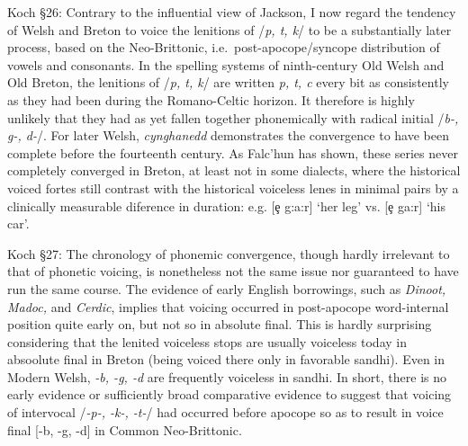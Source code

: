  
 Koch \S26: Contrary to the influential view of Jackson, I now regard the tendency of Welsh and Breton to voice the lenitions of /\textit{p, t, k}/ to be a substantially later process, based on the Neo-Brittonic, i.e.\ post-apocope/syncope distribution of vowels and consonants. In the spelling systems of ninth-century Old Welsh and Old Breton, the lenitions of /\textit{p, t, k}/ are written \textit{p, t, c} every bit as consistently as they had been during the Romano-Celtic horizon. It therefore is highly unlikely that they had as yet fallen together phonemically with radical initial /\textit{b-, g-, d-}/. For later Welsh, \textit{cynghanedd} demonstrates the convergence to have been complete before the fourteenth century. As Falc'hun has shown, these series never completely converged in Breton, at least not in some dialects, where the historical voiced fortes still contrast with the historical voiceless lenes in minimal pairs by a clinically measurable diference in duration: e.g. [\c{e} g:a:r] `her leg' vs. [\c{e} ga:r] `his car'.
 
 Koch \S27: The chronology of phonemic convergence, though hardly irrelevant to that of phonetic voicing, is nonetheless not the same issue nor guaranteed to have run the same course. The evidence of early English borrowings, such as \textit{Dinoot, Madoc,} and \textit{Cerdic}, implies that voicing occurred in post-apocope word-internal position quite early on, but not so in absolute final. This is hardly surprising considering that the lenited voiceless stops are usually voiceless today in absoolute final in Breton (being voiced there only in favorable sandhi). Even in Modern Welsh, \textit{-b, -g, -d} are frequently voiceless in sandhi. In short, there is no early evidence or sufficiently broad comparative evidence to suggest that voicing of intervocal /\textit{-p-, -k-, -t-}/ had occurred before apocope so as to result in voice final [-b, -g, -d] in Common Neo-Brittonic.
 
